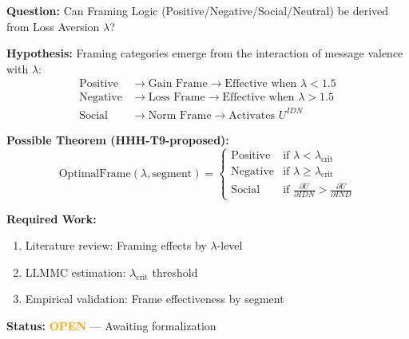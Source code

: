 \begin{tcolorbox}[colback=yellow!5!white, colframe=yellow!75!black,
    title=\textbf{Research Question RQ-1: Framing Emergence (F7)}]

\textbf{Question:} Can Framing Logic (Positive/Negative/Social/Neutral) be derived from Loss Aversion $\lambda$?

\textbf{Hypothesis:} Framing categories emerge from the interaction of message valence with $\lambda$:
\begin{align}
\text{Positive} &\rightarrow \text{Gain Frame} \rightarrow \text{Effective when } \lambda < 1.5 \\
\text{Negative} &\rightarrow \text{Loss Frame} \rightarrow \text{Effective when } \lambda > 1.5 \\
\text{Social} &\rightarrow \text{Norm Frame} \rightarrow \text{Activates } U^{IDN}
\end{align}

\textbf{Possible Theorem (HHH-T9-proposed):}
\begin{equation}
\text{OptimalFrame}(\lambda, \text{segment}) = \begin{cases}
\text{Positive} & \text{if } \lambda < \lambda_{\text{crit}} \\
\text{Negative} & \text{if } \lambda \geq \lambda_{\text{crit}} \\
\text{Social} & \text{if } \frac{\partial U}{\partial IDN} > \frac{\partial U}{\partial IND}
\end{cases}
\end{equation}

\textbf{Required Work:}
\begin{enumerate}[nosep]
    \item Literature review: Framing effects by $\lambda$-level
    \item LLMMC estimation: $\lambda_{\text{crit}}$ threshold
    \item Empirical validation: Frame effectiveness by segment
\end{enumerate}

\textbf{Status:} \textcolor{orange}{\textbf{OPEN}} --- Awaiting formalization
\end{tcolorbox}

